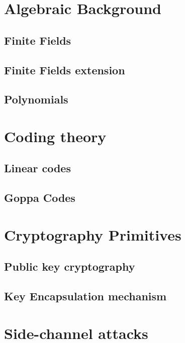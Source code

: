 \section{Algebraic Background}
\subsection{Finite Fields}
\subsection{Finite Fields extension}
\subsection{Polynomials}
\section{Coding theory}
\subsection{Linear codes}
\subsection{Goppa Codes}
\section{Cryptography Primitives}
\subsection{Public key cryptography}
\subsection{Key Encapsulation mechanism}
\section{Side-channel attacks}
